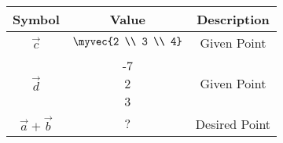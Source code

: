 \begin{tabular}{|c|c|c|}
     \hline
     \textbf{Symbol}& \textbf{Value} & \textbf{Description} \\
     \hline
     $\vec{c}$ & $\myvec{2 \\ 3 \\ 4}$ & Given Point \\ 
     \hline
     $\vec{d}$  & \myvec{-7 \\ 2 \\ 3 } & Given Point \\ 
     \hline
     $\vec{a} + \vec{b} $ & $?$ & Desired Point \\ 
     \hline
\end{tabular}
